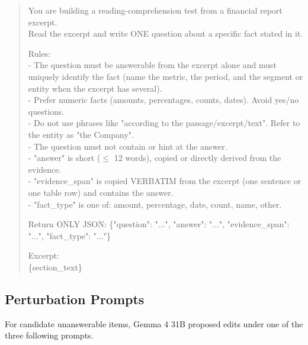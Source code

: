\documentclass[11pt,letterpaper]{article}
\begin{document}
\begin{quote}\small\ttfamily
You are building a reading-comprehension test from a financial report excerpt.\\
Read the excerpt and write ONE question about a specific fact stated in it.

Rules:\\
- The question must be answerable from the excerpt alone and must uniquely identify the fact (name the metric, the period, and the segment or entity when the excerpt has several).\\
- Prefer numeric facts (amounts, percentages, counts, dates). Avoid yes/no questions.\\
- Do not use phrases like "according to the passage/excerpt/text". Refer to the entity as "the Company".\\
- The question must not contain or hint at the answer.\\
- "answer" is short ($\le$ 12 words), copied or directly derived from the evidence.\\
- "evidence\_span" is copied VERBATIM from the excerpt (one sentence or one table row) and contains the answer.\\
- "fact\_type" is one of: amount, percentage, date, count, name, other.

Return ONLY JSON: \{"question": "...", "answer": "...", "evidence\_span": "...", "fact\_type": "..."\}

Excerpt:\\
\{section\_text\}
\end{quote}

\subsection{Perturbation Prompts}
For candidate unanswerable items, Gemma 4 31B proposed edits under one of the three following prompts.
\end{document}
